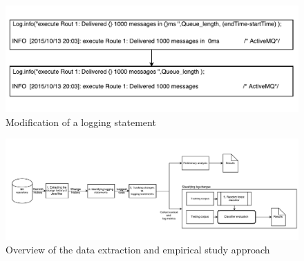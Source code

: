 \begin{figure}[tb]
	\centering
	\includegraphics[width=1\columnwidth]{ExampleOfLogChange_LPA}
	\caption{Modification of a logging statement}
	\label{fig:ExampleOfLogChange_LPA}
\end{figure}

\begin{figure}
	\centering
	\includegraphics[width=1\textwidth,
	height=.4\textwidth]{LogGenalogyMethdology}
	\caption{Overview of the data extraction and empirical study approach}
	\label{fig:LGmethod}
\end{figure}



